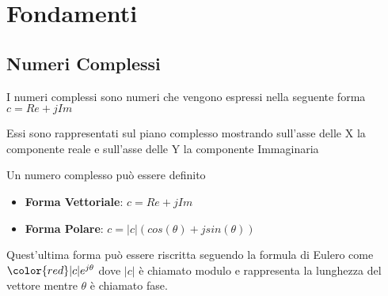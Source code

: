 \section{Fondamenti}
    \subsection{Numeri Complessi}
    I numeri complessi sono numeri che vengono espressi nella seguente forma\\ $c=Re+jIm$
    
    \noindent
    \begin{minipage}{.5\textwidth}
        Essi sono rappresentati sul piano complesso mostrando sull'asse delle X la componente reale e sull'asse delle Y la componente Immaginaria
    \end{minipage}
    \hspace{0.5cm}
    \begin{minipage}{.4\textwidth}
    \end{minipage}
    
    \noindent
    Un numero complesso può essere definito
    \begin{itemize}
        \item \textbf{Forma Vettoriale}: $c=Re+jIm$
        \item \textbf{Forma Polare}: $c=|c|(cos(\theta)+jsin(\theta))$
    \end{itemize}

    \noindent
    Quest'ultima forma può essere riscritta seguendo la formula di Eulero come $\color{red}|c|e^{j\theta}$ dove $|c|$ è chiamato modulo e rappresenta la lunghezza del vettore mentre $\theta$ è chiamato fase.\\
    
